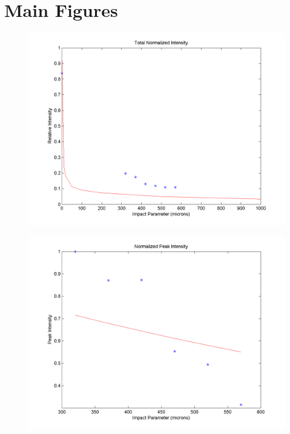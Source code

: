 \documentclass[12pt]{article}
\begin{document}
\section{Main Figures}


\begin{figure}
\begin{center}
\includegraphics[scale=0.5]{Figures/Total_Intensity.PNG}
\caption{}
\end{center}
\end{figure}

\begin{figure}
\begin{center}
\includegraphics[scale=0.5]{Figures/PeakY_ODR.PNG}
\caption{}
\end{center}
\end{figure}
\end{document}
